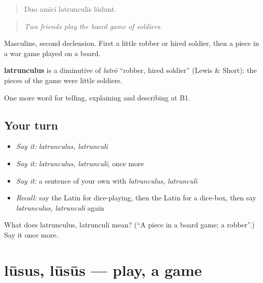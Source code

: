 \begin{quote}
Duo amīcī latrunculīs lūdunt.
\end{quote}

\begin{quote}
\emph{Two friends play the board game of soldiers.}
\end{quote}

Masculine, second declension. First a little robber or hired soldier, then a piece in a war game played on a board.

\begin{cousinweb}
\textbf{latrunculus} is a diminutive of \emph{latrō} \textquotedblleft{}robber, hired soldier\textquotedblright{} (Lewis \& Short): the pieces of the game were little soldiers.
\end{cousinweb}

\begin{grammarlens}[title={What you've built}]
One more word for telling, explaining and describing at B1.
\end{grammarlens}

\subsection*{Your turn}
\begin{itemize}
\raggedright
  \item \emph{Say it:} \emph{latrunculus, latrunculī}
  \item \emph{Say it:} \emph{latrunculus, latrunculī}, once more
  \item \emph{Say it:} a sentence of your own with \emph{latrunculus, latrunculī}
  \item \emph{Recall:} say the Latin for dice-playing, then the Latin for a dice-box, then say \emph{latrunculus, latrunculī} again
\end{itemize}

\begin{tcolorbox}[breakable,colback=teal!4,colframe=teal!35!black,title={Before you move on}]
What does latrunculus, latrunculī mean? (\textquotedblleft{}A piece in a board game; a robber\textquotedblright{}.) Say it once more.
\end{tcolorbox}
\section[lūsus, lūsūs]{lūsus, lūsūs — play, a game}

\label{lesson:LA-C539-lusus}




